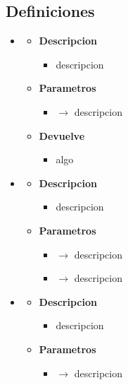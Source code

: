 \subsection{Definiciones}
\begin{itemize}
	\item {}
	\begin{itemize}
		\item \textbf{Descripcion}
        \begin{itemize}
			\item descripcion
		\end{itemize}
        \item \textbf{Parametros}
		\begin{itemize}
			\item {} $\rightarrow$ descripcion
		\end{itemize}
		\item \textbf{Devuelve}
		\begin{itemize}
			\item algo
		\end{itemize}
	\end{itemize}
	\item{}
	\begin{itemize}
		\item \textbf{Descripcion}
        \begin{itemize}
			\item descripcion
		\end{itemize}
        \item \textbf{Parametros}
		\begin{itemize}
			\item {} $\rightarrow$ descripcion
            \item {} $\rightarrow$ descripcion
		\end{itemize}
	\end{itemize}
    \item{}
	\begin{itemize}
		\item \textbf{Descripcion}
        \begin{itemize}
			\item descripcion
		\end{itemize}
        \item \textbf{Parametros}
		\begin{itemize}
			\item {} $\rightarrow$ descripcion

\end{itemize}
\end{itemize}
\end{itemize}
